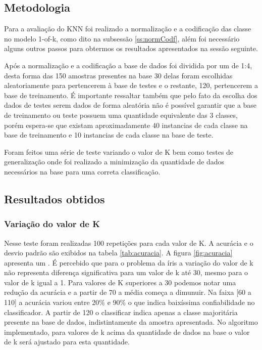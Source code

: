 \documentclass[ 
	article,			%
	11pt,				%
	oneside,			%
	a4paper,			%
	english,			%
	brazil,				%
	]{abntex2}
\begin{document}
\subsection{Metodologia}
\label{ss:metAplKnn}

Para a avaliação do KNN foi realizado a normalização e a codificação das classe
no modelo 1-of-k, como dito na subsessão \ref{ss:normCodf}, além foi necessário
alguns outros passos para obtermos os resultados apresentados na sessão
seguinte.

Após a normalização e a codificação a base de dados foi dividida por um  de 1:4,
desta forma das 150 amostras presentes na base 30 delas foram escolhidas
aleatoriamente para pertencerem à base de testes e o restante, 120, pertencerem
a base de treinamento. É importante ressaltar também que pelo fato da escolha
dos dados de testes serem dados de forma aleatória não é possível garantir que a
base de treinamento ou teste possuem uma quantidade equivalente das 3 classes,
porém espera-se que existam aproximadamente 40 instancias de cada classe na base
de treinamento e 10 instancias de cada classe na base de teste.

Foram feitos uma série de teste variando o valor de K bem como testes de
generalização onde foi realizado a minimização da quantidade de dados
necessários na base para uma correta classificação.

\subsection{Resultados obtidos}

\subsubsection{Variação do valor de K}
Nesse teste foram realizadas 100 repetições para cada valor de K. A acurácia e o
desvio padrão são exibidos na tabela \ref{tab:acuracia}. A figura
\ref{fig:acuracia} apresenta um . 
É percebido que para o problema da íris a variação do valor de k não representa
diferença significativa para um valor de k até 30, mesmo para o valor de k igual
a 1. Para valores de K superiores a 30 podemos notar uma redução da acurácia e a
partir de 70 a média começa a dimunuir. Na faixa [60 a 110] a acurácia variou
entre 20\% e 90\% o que indica baixíssima confiabilidade no classificador. A
partir de 120 o classificar indica apenas a classe majoritária presente na base
de dados, indistintamente da amostra apresentada. No algoritmo implementado,
para valores de k acima da quantidade de dados na base o valor de k será
ajustado para esta quantidade.
\end{document}
